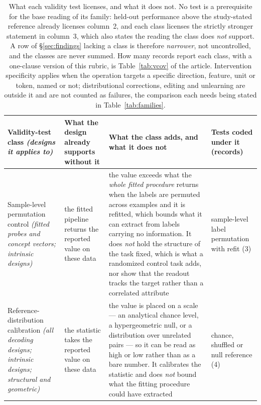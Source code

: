 \begin{table}
\centering\footnotesize\setlength\tabcolsep{4pt}\renewcommand{\arraystretch}{1.05}
\caption{What each validity test licenses, and what it does not. No test is a prerequisite for the base reading of its family: held-out performance above the study-stated reference already licenses column~2, and each class licenses the strictly stronger statement in column~3, which also states the reading the class does \emph{not} support. A row of \S\ref{sec:findings} lacking a class is therefore \emph{narrower}, not uncontrolled, and the classes are never summed. How many records report each class, with a one-clause version of this rubric, is Table~\ref{tab:vcov} of the article. Intervention specificity applies when the operation targets a specific direction, feature, unit or token, named or not; distributional corrections, editing and unlearning are outside it and are not counted as failures, the comparison each needs being stated in Table~\ref{tab:families}.}
\label{tab:rubric}
\begin{tabular}{@{}L{3.0cm}L{3.6cm}L{10.5cm}L{3.6cm}@{}}
\toprule
Validity-test class \emph{(designs it applies to)} & What the design already supports without it & What the class adds, and what it does not & Tests coded under it (records) \\
\midrule
Sample-level permutation control \emph{(fitted probes and concept vectors; intrinsic designs)} & the fitted pipeline returns the reported value on these data & the value exceeds what the \emph{whole fitted procedure} returns when the labels are permuted across examples and it is refitted, which bounds what it can extract from labels carrying no information. It does \emph{not} hold the structure of the task fixed, which is what a randomized control task adds, nor show that the readout tracks the target rather than a correlated attribute & sample-level label permutation with refit (3) \\
Reference-distribution calibration \emph{(all decoding designs; intrinsic designs; structural and geometric)} & the statistic takes the reported value on these data & the value is placed on a scale --- an analytical chance level, a hypergeometric null, or a distribution over unrelated pairs --- so it can be read as high or low rather than as a bare number. It calibrates the statistic and does \emph{not} bound what the fitting procedure could have extracted & chance, shuffled or null reference (4) \\

\end{tabular}
\end{table}
